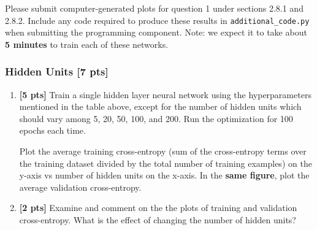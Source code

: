 Please submit computer-generated plots for question 1 under sections 2.8.1 and 2.8.2. Include any code required to produce these results in \texttt{additional\_code.py} when submitting the programming component. Note: we expect it to take about \textbf{5 minutes} to train each of these networks.

\subsubsection{Hidden Units [7 pts]}

\begin{enumerate}
    \item \textbf{[5 pts]} Train a single hidden layer neural network using the hyperparameters mentioned in the table above, except for the number of hidden units which should vary among 5, 20, 50, 100, and 200.  Run the optimization for 100 epochs each time.

    Plot the average training cross-entropy (sum of the cross-entropy terms over the training dataset divided by the total number of training examples) on the y-axis vs number of hidden units on the x-axis. In the \textbf{same figure}, plot the average validation cross-entropy.
    
    \begin{tcolorbox}[fit,height=10cm, width=\textwidth, blank, borderline={1pt}{-2pt},nobeforeafter]

    \end{tcolorbox}
    
    \item \textbf{[2 pts]} Examine and comment on the the plots of training and validation cross-entropy. What is the effect of changing the number of hidden units?
    
    \begin{tcolorbox}[fit,height=2cm, width=\textwidth, blank, borderline={1pt}{-2pt},nobeforeafter]

    \end{tcolorbox}
\end{enumerate}

\newpage

